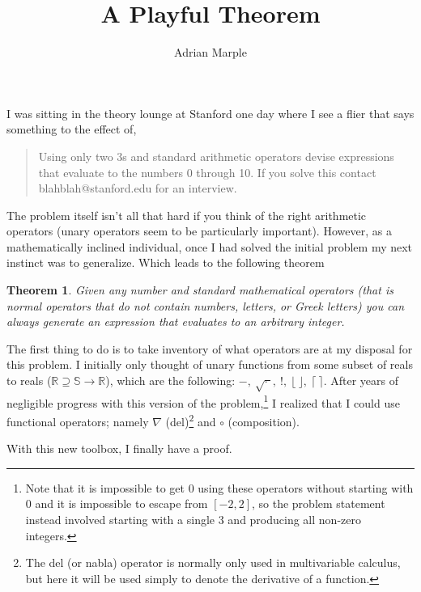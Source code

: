 \documentclass[10pt]{article}
\title{A Playful Theorem}
\author{Adrian Marple}
\newtheorem{theorem}{Theorem}
\begin{document}
\maketitle

I was sitting in the theory lounge at Stanford one day where I see a flier that says something to the effect of,
\begin{quote}
	Using only two 3s and standard arithmetic operators devise expressions that evaluate to the numbers 0 through 10.  If you solve this contact blahblah@stanford.edu for an interview.
\end{quote} 
The problem itself isn't all that hard if you think of the right arithmetic operators (unary operators seem to be particularly important).
However, as a mathematically inclined individual, once I had solved the initial problem my next instinct was to generalize.  Which leads to the following theorem

\begin{theorem}
	Given any number and standard mathematical operators (that is normal operators that do not contain numbers, letters, or Greek letters) you can always generate an expression that evaluates to an arbitrary integer.
	\label{thm:playful}
\end{theorem}

The first thing to do is to take inventory of what operators are at my disposal for this problem.  I initially only thought of unary functions from some subset of reals to reals ($\mathbb{R} \supseteq \mathbb{S} \rightarrow \mathbb{R}$), which are the following: $-,\ \sqrt{\cdot\ },\ !,\ \lfloor~\rfloor,\ \lceil~\rceil$.  After years of negligible progress with this version of the problem,\footnote{Note that it is impossible to get 0 using these operators without starting with 0 and it is impossible to escape from $[-2,2]$, so the problem statement instead involved starting with a single 3 and producing all non-zero integers.} I realized that I could use functional operators; namely $\nabla$ (del)\footnote{The del (or nabla) operator is normally only used in multivariable calculus, but here it will be used simply to denote the derivative of a function.} and $\circ$ (composition).

With this new toolbox, I finally have a proof.
\end{document}
